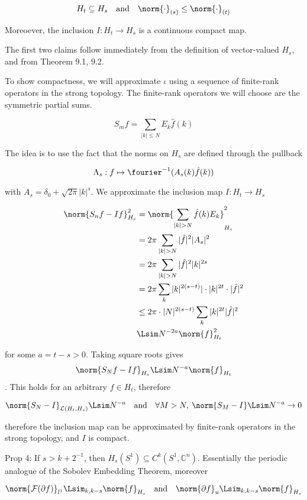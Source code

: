 \[
H_t\subseteq H_s\quad\text{and}\quad \norm{\cdot}_{(s)}\leq\norm{\cdot}_{(t)}
\]

Moreoever, the inclusion \(I: H_t\to H_s\) is a continuous compact map.

The first two claims follow immediately from the definition of
vector-valued \(H_s\), and from Theorem 9.1, 9.2.

To show compactness, we will approximate \(\iota\) using a sequence of
finite-rank operators in the strong topology. The finite-rank operators
we will choose are the symmetric partial sums.

\[
S_m f = \sum_{\vert k\vert \leq N} E_k\hat{f}(k)
\]

The idea is to use the fact that the norms on \(H_s\) are defined
through the pullback

\[
\Lambda_s: f\mapsto \fourier^{-1}(A_s(k)\hat{f}(k))
\]

with \(A_s = \delta_0 + \sqrt{2\pi}\vert k\vert^{s}\). We approximate
the inclusion map \(I: H_t\to H_s\)

\[
\begin{align}
\norm{S_n f - If}_{H_s}^{2} &= \norm{\sum_{\vert k\vert > N}\hat{f}(k)E_k }_{H_s}^{2}\\
&=2\pi\sum_{\vert k\vert> N}\vert\hat{f}\vert^2\vert A_s\vert^2\\
&=2\pi\sum_{\vert k\vert> N}\vert\hat{f}\vert^2\vert k\vert^{2s}\\
&=2\pi\sum_{k}\vert k\vert^{2(s-t)}\vert\cdot \vert k\vert^{2t}\cdot\vert\hat{f}\vert^2\\
&\leq 2\pi\cdot\vert N\vert^{2(s-t)}\sum_{k}\vert k\vert^{2t}\vert\hat{f}\vert^2\\
&\Lsim N^{-2a}\norm{f}^2_{H_t}
\end{align}
\]

for some \(a = t-s > 0\). Taking square roots gives
\[\norm{S_N f - If}_{H_s}\Lsim N^{-a}\norm{f}_{H_t}\]. This holds for an
arbitrary \(f\in H_t\), therefore

\[
\norm{S_N -I}_{\mathcal{L}(H_t, H_s)}\Lsim N^{-a}\quad\text{and}\quad\forall M>N,\: \norm{S_M - I}\Lsim N^{-a}\to 0
\]

therefore the inclusion map can be approximated by finite-rank operators
in the strong topology, and \(I\) is compact.

Prop 4: If \(s>k+2^{-1}\), then
\(H_s(S^1)\subseteq C^k(S^1,\mathbb{C}^n)\). Essentially the periodic
analogue of the Sobolev Embedding Theorem, moreover

\[
\norm{\mathcal{F}(\partial f)}_{l^1}\Lsim_{k,k-s}\norm{f}_{H_s}\quad\text{and}\quad \norm{\partial f}_{u}\Lsim_{k,k-s}\norm{f}_{H_s}
\]

